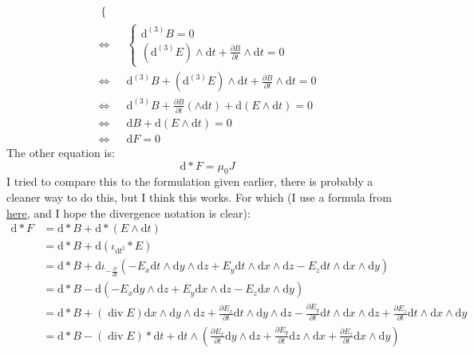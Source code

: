 \documentclass[12pt,a4]{article}
\DeclareMathOperator{\Div}{div}
\newcommand{\e}{\mathrm{d}}
\begin{document}
\begin{enumerate}
\begin{enumerate}
\begin{align*}
\begin{cases}
          \end{cases}\\
          \Leftrightarrow &
          \begin{cases}
            \e ^{(3)} B = 0\\
           (\e ^{(3)} E )\wedge \e t + \frac{\partial B}{\partial t} \wedge \e t = 0
          \end{cases}\\
          \Leftrightarrow &
            \e ^{(3)} B + (\e ^{(3)} E )\wedge \e t + \frac{\partial B}{\partial t} \wedge \e t = 0\\
          \Leftrightarrow &
            \e ^{(3)} B  + \frac{\partial B}{\partial t} (\wedge \e t) + \e (E \wedge \e t) = 0\\
          \Leftrightarrow &
            \e B   + \e (E \wedge \e t) = 0\\
          \Leftrightarrow &
            \e F = 0
        \end{align*}
        The other equation is:
        \begin{equation*}
          \e * F = \mu_0 J
        \end{equation*}
        I tried to compare this to the formulation given earlier, there is probably a cleaner way to do this, but I think this works.
        For which (I use a formula from \href{https://mathoverflow.net/questions/162366/distributing-the-hodge-map-over-the-wedge-product}{here}, and I hope the divergence notation is clear):
        \begin{align*}
          \e * F &= \e * B + \e * (E \wedge \e t)\\
                 &= \e * B + \e \left(\iota_{\e t^\sharp} * E \right)\\
                 &= \e * B + \e \iota_{-\frac{\partial}{\partial t}} (-E_x \e t \wedge \e y \wedge \e z + E_y \e t \wedge \e x \wedge \e z - E_z\e t \wedge \e x \wedge \e y)\\
                 &= \e * B - \e (-E_x \e y \wedge \e z + E_y \e x \wedge \e z - E_z \e x \wedge \e y)\\
                 &= \e * B + (\Div E ) \e x \wedge \e y \wedge \e z + \frac{\partial E_x}{\partial t} \e t \wedge \e y \wedge \e z - \frac{\partial E_y}{\partial t} \e t \wedge \e x \wedge \e z + \frac{\partial E_z}{\partial t} \e t \wedge \e x \wedge \e y\\
                 &= \e * B - (\Div E ) *\e t + \e t \wedge \left(\frac{\partial E_x}{\partial t}  \e y \wedge \e z + \frac{\partial E_y}{\partial t} \e z \wedge \e x + \frac{\partial E_z}{\partial t} \e x \wedge  \e y\right)\\

\end{align*}
\end{enumerate}
\end{enumerate}
\end{document}
